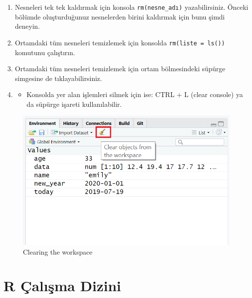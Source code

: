\documentclass[
  oneside]{book}
\providecommand{\tightlist}{%
  \setlength{\itemsep}{0pt}\setlength{\parskip}{0pt}}
\begin{document}
\begin{enumerate}
\def\labelenumi{\arabic{enumi}.}
\item
  Nesneleri tek tek kaldırmak için konsola \texttt{rm(nesne\_adı)} yazabilirsiniz. Önceki bölümde oluşturduğunuz nesnelerden birini kaldırmak için bunu şimdi deneyin.
\item
  Ortamdaki tüm nesneleri temizlemek için konsolda \texttt{rm(liste\ =\ ls())} komutunu çalıştırın.
\item
  Ortamdaki tüm nesneleri temizlemek için ortam bölmesindeki süpürge simgesine de tıklayabilirsiniz.
\item
  \begin{itemize}
  \tightlist
  \item
    Konsolda yer alan işlemleri silmek için ise: CTRL + L (clear console) ya da süpürge işareti kullanılabilir.
  \end{itemize}
\end{enumerate}

\begin{figure}

{\centering \includegraphics[width=1\linewidth]{images/broom} 

}

\caption{Clearing the workspace}\label{fig:img-broom}
\end{figure}

\hypertarget{r-uxe7alux131ux15fma-dizini}{%
\section{R Çalışma Dizini}\label{r-uxe7alux131ux15fma-dizini}}
\end{document}
